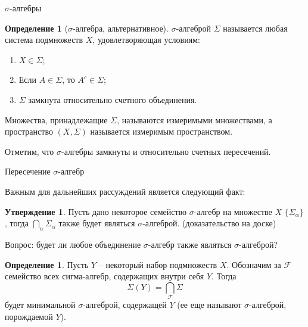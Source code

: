 \documentclass{beamer}%
\theoremstyle{definition}
\newtheorem{mydef}[theorem]{Определение}
\newtheorem{proposition}[theorem]{Утверждение}
\begin{document}
\begin{frame}{$\sigma$-алгебры}
    \begin{mydef}[$\sigma$-алгебра, альтернативное]
    $\sigma$-алгеброй $\Sigma$ называется любая система подмножеств $X$, удовлетворяющая условиям:
    \begin{enumerate}
        \item $X \in \Sigma$;
        \item Если $A \in \Sigma$, то $A^c \in \Sigma$;
        \item $\Sigma$ замкнута относительно счетного объединения.
    \end{enumerate}
    
    Множества, принадлежащие $\Sigma$, называются измеримыми множествами, а пространство $(X, \Sigma)$ называется измеримым пространством.
    
    \end{mydef} %
    
    
    Отметим, что $\sigma$-алгебры замкнуты и относительно счетных пересечений. 
    
\end{frame}

\begin{frame}{Пересечение $\sigma$-алгебр}

Важным для дальнейших рассуждений является следующий факт:

\begin{proposition}
    Пусть дано некоторое семейство $\sigma$-алгебр на множестве $X$ $\{\Sigma_\alpha\}$, тогда $\bigcap_{\alpha} \Sigma_{\alpha}$ также будет являться $\sigma$-алгеброй. (доказательство на доске)
    
\end{proposition}

Вопрос: будет ли любое объединение $\sigma$-алгебр также являться $\sigma$-алгеброй? 

\begin{mydef}
Пусть $Y$ -- некоторый набор подмножеств $X$. Обозначим за $\mathcal{F}$ семейство всех сигма-алгебр, содержащих внутри себя $Y$. Тогда 
$$\Sigma(Y) = \bigcap_{\mathcal{F}} \Sigma$$
будет минимальной $\sigma$-алгеброй, содержащей $Y$ (ее еще называют $\sigma$-алгеброй, порождаемой $Y$).
\end{mydef}
    
\end{frame}
\end{document}
